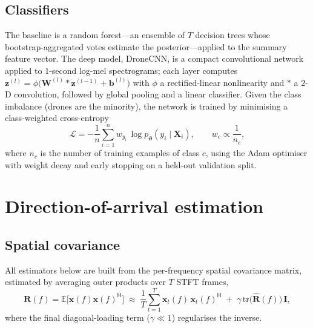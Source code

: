 \documentclass[11pt]{article}
\newcommand{\herm}{^{\mathsf{H}}}
\newcommand{\Rmat}{\mathbf{R}}
\newcommand{\xv}{\mathbf{x}}
\newcommand{\Ex}{\mathbb{E}}
\begin{document}
\subsection{Classifiers}
The baseline is a random forest---an ensemble of $T$ decision trees whose
bootstrap-aggregated votes estimate the posterior---applied to the summary
feature vector. The deep model, DroneCNN, is a compact convolutional network
applied to $1$-second log-mel spectrograms; each layer computes
$\mathbf{z}^{(l)} = \phi\big(\mathbf{W}^{(l)} * \mathbf{z}^{(l-1)} + \mathbf{b}^{(l)}\big)$
with $\phi$ a rectified-linear nonlinearity and $*$ a $2$-D convolution, followed
by global pooling and a linear classifier. Given the class imbalance (drones are
the minority), the network is trained by minimising a class-weighted
cross-entropy
\begin{equation}
\mathcal{L} = -\frac{1}{n}\sum_{i=1}^{n} w_{y_i}\,
\log p_{\boldsymbol{\vartheta}}(y_i\mid \mathbf{X}_i),
\qquad w_c \propto \frac{1}{n_c},
\end{equation}
where $n_c$ is the number of training examples of class $c$, using the Adam
optimiser with weight decay and early stopping on a held-out validation split.

\section{Direction-of-arrival estimation}
\label{sec:doa}
\subsection{Spatial covariance}
All estimators below are built from the per-frequency spatial covariance matrix,
estimated by averaging outer products over $T$ STFT frames,
\begin{equation}
\Rmat(f) = \Ex\big[\xv(f)\xv(f)\herm\big]
\;\approx\; \frac{1}{T}\sum_{t=1}^{T} \xv_t(f)\,\xv_t(f)\herm
\;+\; \gamma\,\mathrm{tr}\!\big(\hat{\Rmat}(f)\big)\,\mathbf{I},
\end{equation}
where the final diagonal-loading term ($\gamma\ll1$) regularises the inverse.
\end{document}
